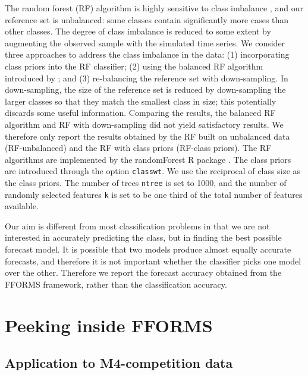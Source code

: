 \documentclass[11pt,a4paper,]{article}
\begin{document}
The random forest (RF) algorithm is highly sensitive to class imbalance \autocite{breiman2001random}, and our reference set is unbalanced: some classes contain significantly more cases than other classes. The degree of class imbalance is reduced to some extent by augmenting the observed sample with the simulated time series. We consider three approaches to address the class imbalance in the data: (1) incorporating class priors into the RF classifier; (2) using the balanced RF algorithm introduced by \textcite{chen2004using}; and (3) re-balancing the reference set with down-sampling. In down-sampling, the size of the reference set is reduced by down-sampling the larger classes so that they match the smallest class in size; this potentially discards some useful information. Comparing the results, the balanced RF algorithm and RF with down-sampling did not yield satisfactory results. We therefore only report the results obtained by the RF built on unbalanced data (RF-unbalanced) and the RF with class priors (RF-class priors). The RF algorithms are implemented by the randomForest R package \autocites{liaw2002randomforest}{rfpkg}. The class priors are introduced through the option \texttt{classwt}. We use the reciprocal of class size as the class priors. The number of trees \texttt{ntree} is set to 1000, and the number of randomly selected features \texttt{k} is set to be one third of the total number of features available.

Our aim is different from most classification problems in that we are not interested in accurately predicting the class, but in finding the best possible forecast model. It is possible that two models produce almost equally accurate forecasts, and therefore it is not important whether the classifier picks one model over the other. Therefore we report the forecast accuracy obtained from the FFORMS framework, rather than the classification accuracy.

\hypertarget{peeking}{%
\section{Peeking inside FFORMS}\label{peeking}}

\hypertarget{application-to-m4-competition-data}{%
\subsection{Application to M4-competition data}\label{application-to-m4-competition-data}}
\end{document}
